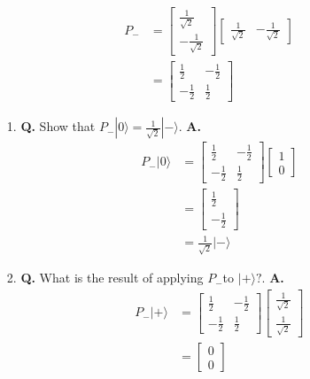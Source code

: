 \documentclass[main.tex]{subfiles}
\begin{document}
\begin{enumerate}
    \begin{align*}
        P_{-}   & = \left[\begin{array}{c} \frac{1}{\sqrt{2}} \\ -\frac{1}{\sqrt{2}} \end{array}\right] \left[\begin{array}{ll} \frac{1}{\sqrt{2}} & -\frac{1}{\sqrt{2}} \end{array}\right]\\
                & = \left[\begin{array}{cc} \frac{1}{2} & -\frac{1}{2} \\ -\frac{1}{2} & \frac{1}{2} \end{array}\right]
    \end{align*}

    \begin{enumerate}
    \item[1.] \textbf{Q.} Show that $P_{-}|0\rangle=\frac{1}{\sqrt{2}}|-\rangle$. \textbf{A.}
        \begin{align*}
            P_{-}|0\rangle  & = \left[\begin{array}{cc} \frac{1}{2} & -\frac{1}{2} \\ -\frac{1}{2} & \frac{1}{2} \end{array}\right] \left[\begin{array}{c} 1 \\ 0 \end{array}\right]\\
                            & = \left[\begin{array}{c} \frac{1}{2} \\ -\frac{1}{2} \end{array}\right]\\
                            & = \frac{1}{\sqrt{2}}|-\rangle
        \end{align*}
    
    \item[2.] \textbf{Q.} What is the result of applying $P_{-}$to $|+\rangle ?$. \textbf{A.}
        \begin{align*}
            P_{-}|+\rangle  & = \left[\begin{array}{cc} \frac{1}{2} & -\frac{1}{2} \\ -\frac{1}{2} & \frac{1}{2} \end{array}\right] \left[\begin{array}{c} \frac{1}{\sqrt{2}} \\ \frac{1}{\sqrt{2}} \end{array}\right]\\
                            & = \left[\begin{array}{l} 0 \\ 0 \end{array}\right]
        \end{align*}


\end{enumerate}
\end{enumerate}
\end{document}
